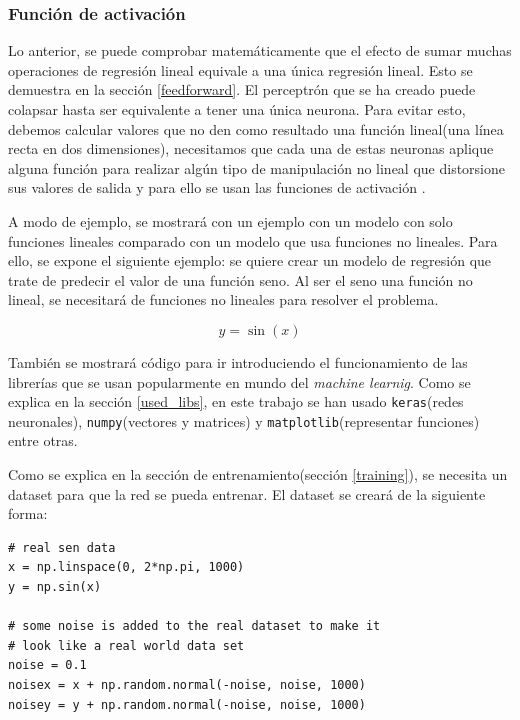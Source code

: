 \subsubsection{Función de activación}\label{activationfunction}

Lo anterior, se puede comprobar matemáticamente que el efecto de sumar muchas operaciones de regresión lineal equivale a una única regresión lineal. Esto se demuestra en la sección \ref{feedforward}. El perceptrón que se ha creado puede colapsar hasta ser equivalente a tener una única neurona. Para evitar esto, debemos calcular valores que no den como resultado una función lineal(una línea recta en dos dimensiones), necesitamos que cada una de estas neuronas aplique alguna función para realizar algún tipo de manipulación no lineal que distorsione sus valores de salida y para ello se usan las funciones de activación \cite{nielsen}.
\newline

A modo de ejemplo, se mostrará con un ejemplo con un modelo con solo funciones lineales comparado con un modelo que usa funciones no lineales. Para ello, se expone el siguiente ejemplo: se quiere crear un modelo de regresión que trate de predecir el valor de una función seno. Al ser el seno una función no lineal, se necesitará de funciones no lineales para resolver el problema.

\begin{equation}
    y = \sin(x)
\end{equation}

También se mostrará código para ir introduciendo el funcionamiento de las librerías que se usan popularmente en mundo del \textit{machine learnig}. Como se explica en la sección \ref{used_libs}, en este trabajo se han usado \verb|keras|(redes neuronales), \verb|numpy|(vectores y matrices) y \verb|matplotlib|(representar funciones) entre otras. 
\newline

Como se explica en la sección de entrenamiento(sección \ref{training}), se necesita un dataset para que la red se pueda entrenar. El dataset se creará de la siguiente forma:


\begin{verbatim}
# real sen data
x = np.linspace(0, 2*np.pi, 1000)
y = np.sin(x)

# some noise is added to the real dataset to make it 
# look like a real world data set
noise = 0.1
noisex = x + np.random.normal(-noise, noise, 1000)
noisey = y + np.random.normal(-noise, noise, 1000)
\end{verbatim}

